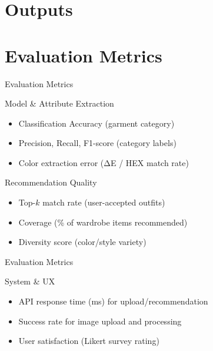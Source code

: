 \documentclass[11pt,aspectratio=169,notes,mathserif]{beamer}
\begin{document}
\section{Outputs}
\section{Evaluation Metrics}

\begin{frame}{Evaluation Metrics}
\footnotesize
\begin{block}{Model \& Attribute Extraction}
\begin{itemize}
	\item Classification Accuracy (garment category)
	\item Precision, Recall, F1-score (category labels)
	\item Color extraction error (ΔE / HEX match rate)
\end{itemize}
\end{block}

\vspace{0.25cm}

\begin{block}{Recommendation Quality}
\begin{itemize}
	\item Top-$k$ match rate (user-accepted outfits)
	\item Coverage (\% of wardrobe items recommended)
	\item Diversity score (color/style variety)
\end{itemize}
\end{block}
\end{frame}

\begin{frame}{Evaluation Metrics}
\footnotesize
\begin{block}{System \& UX}
\begin{itemize}
	\item API response time (ms) for upload/recommendation
	\item Success rate for image upload and processing
	\item User satisfaction (Likert survey rating)
\end{itemize}
\end{block}
\end{frame}

\end{document}
